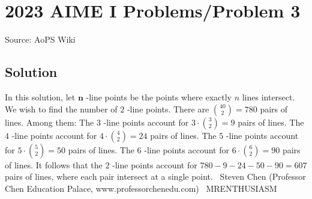 \documentclass[12pt]{article}
\begin{document}
\section*{{2023 AIME I Problems/Problem 3}}
Source: AoPS Wiki

\subsection*{Solution}
In this solution, let $\boldsymbol{n}$ -line points be the points where exactly $n$ lines intersect. We wish to find the number of $2$ -line points. There are $\binom{40}{2}=780$ pairs of lines. Among them: The $3$ -line points account for $3\cdot\binom32=9$ pairs of lines. The $4$ -line points account for $4\cdot\binom42=24$ pairs of lines. The $5$ -line points account for $5\cdot\binom52=50$ pairs of lines. The $6$ -line points account for $6\cdot\binom62=90$ pairs of lines. It follows that the $2$ -line points account for $780-9-24-50-90=\boxed{607}$ pairs of lines, where each pair intersect at a single point. ~Steven Chen (Professor Chen Education Palace, www.professorchenedu.com) ~MRENTHUSIASM
\end{document}
